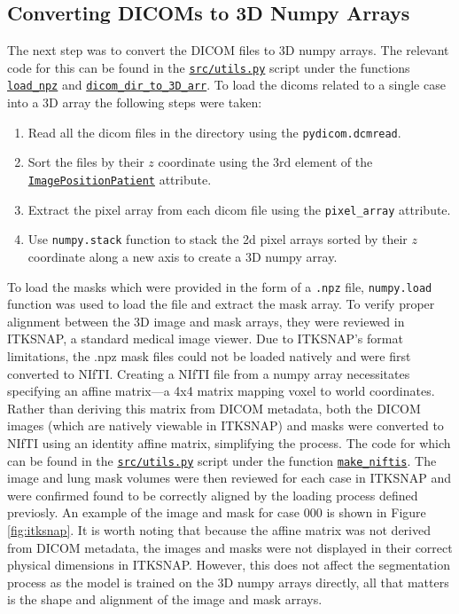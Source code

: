 \documentclass[11pt]{article}
\begin{document}
\subsection{Converting DICOMs to 3D Numpy Arrays}
The next step was to convert the DICOM files to 3D numpy arrays. The relevant code for this can be found in the \texttt{\url{src/utils.py}} script under the functions \texttt{\url{load\_npz}} and \texttt{\url{dicom\_dir\_to\_3D\_arr}}. To load the dicoms related to a single case into a 3D array the following steps were taken:
\begin{enumerate}
    \item Read all the dicom files in the directory using the \texttt{pydicom.dcmread}.
    \item Sort the files by their $z$ coordinate using the 3rd element of the \texttt{\url{ImagePositionPatient}} attribute.
    \item Extract the pixel array from each dicom file using the \texttt{pixel\_array} attribute.
    \item Use \texttt{numpy.stack} function to stack the 2d pixel arrays sorted by their $z$ coordinate along a new axis to create a 3D numpy array.
\end{enumerate} To load the masks which were provided in the form of a \texttt{.npz} file, 
\texttt{numpy.load} function was used to load the file and extract the mask array.
To verify proper alignment between the 3D image and mask arrays, they were reviewed in ITKSNAP, a standard medical image viewer. Due to ITKSNAP's format limitations, the .npz mask files could not be loaded natively and were first converted to NIfTI. Creating a NIfTI file from a numpy array necessitates specifying an affine matrix—a 4x4 matrix mapping voxel to world coordinates. Rather than deriving this matrix from DICOM metadata, both the DICOM images (which are natively viewable in ITKSNAP) and masks were converted to NIfTI using an identity affine matrix, simplifying the process. The code for which can be found in the \texttt{\url{src/utils.py}} script under the function \texttt{\url{make_niftis}}. The image and lung mask volumes were then reviewed for each case in ITKSNAP and were confirmed found to be correctly aligned by the loading process defined previosly. An example of the image and mask for case 000 is shown in Figure \ref{fig:itksnap}. It is worth noting that because the affine matrix was not derived from DICOM metadata, the images and masks were not displayed in their correct physical dimensions in ITKSNAP. However, this does not affect the segmentation process as the model is trained on the 3D numpy arrays directly, all that matters is the shape and alignment of the image and mask arrays.
\end{document}
